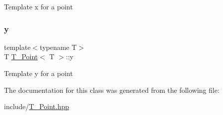 Template x for a point \mbox{\label{classT__Point_a28da35a974844bdb3509a90345d3c1f9}} 
\subsubsection{\texorpdfstring{y}{y}}
{\footnotesize\ttfamily template$<$typename T$>$ \\
T \hyperlink{classT__Point}{T\+\_\+\+Point}$<$ T $>$\+::y}

Template y for a point 

The documentation for this class was generated from the following file\+:\begin{DoxyCompactItemize}
\item 
include/\hyperlink{T__Point_8hpp}{T\+\_\+\+Point.\+hpp}\end{DoxyCompactItemize}
